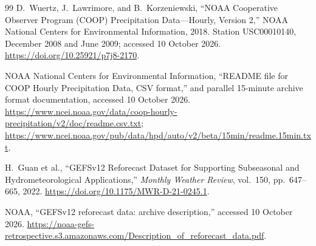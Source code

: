 \documentclass[12pt]{article}
\begin{document}
\begin{thebibliography}{99}
D.~Wuertz, J.~Lawrimore, and B.~Korzeniewski,
``NOAA Cooperative Observer Program (COOP) Precipitation Data---Hourly,
Version 2,'' NOAA National Centers for Environmental Information, 2018.
Station USC00010140, December 2008 and June 2009; accessed 10 October 2026.
\url{https://doi.org/10.25921/p7j8-2170}.

NOAA National Centers for Environmental Information,
``README file for COOP Hourly Precipitation Data, CSV format,''
and parallel 15-minute archive format documentation, accessed 10 October 2026.
\url{https://www.ncei.noaa.gov/data/coop-hourly-precipitation/v2/doc/readme.csv.txt};
\url{https://www.ncei.noaa.gov/pub/data/hpd/auto/v2/beta/15min/readme.15min.txt}.

H.~Guan et al., ``GEFSv12 Reforecast Dataset for Supporting Subseasonal
and Hydrometeorological Applications,'' \emph{Monthly Weather Review},
vol.~150, pp.~647--665, 2022.
\url{https://doi.org/10.1175/MWR-D-21-0245.1}.

NOAA, ``GEFSv12 reforecast data: archive description,'' accessed 10 October 2026.
\url{https://noaa-gefs-retrospective.s3.amazonaws.com/Description_of_reforecast_data.pdf}.
\end{thebibliography}
\end{document}
